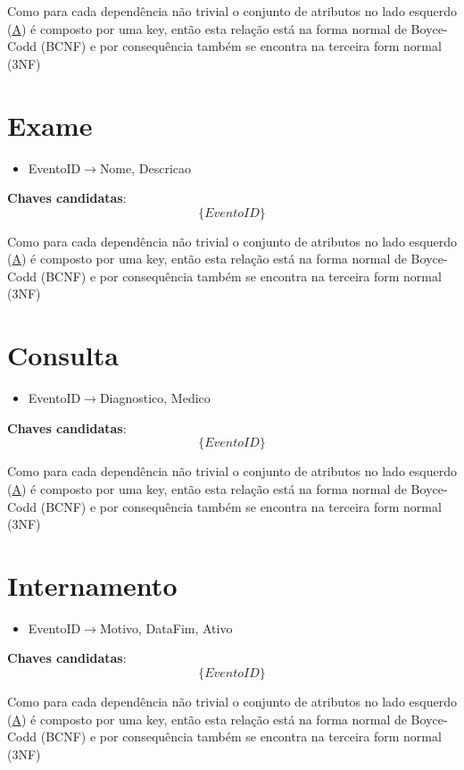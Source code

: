 \documentclass[article, a4paper, 12pt, oneside]{memoir}
\begin{document}
Como para cada dependência não trivial o conjunto de atributos no lado esquerdo (\underline{A}) é composto por uma key, então esta relação está na forma normal de Boyce-Codd (BCNF) e por consequência também se encontra na terceira form normal (3NF)

\section*{Exame}
\begin{itemize}
	\item EventoID$\rightarrow$Nome, Descricao
\end{itemize}

\textbf{Chaves candidatas}:\\
\[
\{ EventoID \}
\]

Como para cada dependência não trivial o conjunto de atributos no lado esquerdo (\underline{A}) é composto por uma key, então esta relação está na forma normal de Boyce-Codd (BCNF) e por consequência também se encontra na terceira form normal (3NF)

\section*{Consulta}
\begin{itemize}
	\item EventoID$\rightarrow$Diagnostico, Medico
\end{itemize}

\textbf{Chaves candidatas}:\\
\[
\{ EventoID \}
\]

Como para cada dependência não trivial o conjunto de atributos no lado esquerdo (\underline{A}) é composto por uma key, então esta relação está na forma normal de Boyce-Codd (BCNF) e por consequência também se encontra na terceira form normal (3NF)

\section*{Internamento}
\begin{itemize}
	\item EventoID$\rightarrow$Motivo, DataFim, Ativo
\end{itemize}

\textbf{Chaves candidatas}:\\
\[
\{ EventoID \}
\]

Como para cada dependência não trivial o conjunto de atributos no lado esquerdo (\underline{A}) é composto por uma key, então esta relação está na forma normal de Boyce-Codd (BCNF) e por consequência também se encontra na terceira form normal (3NF)
\end{document}
